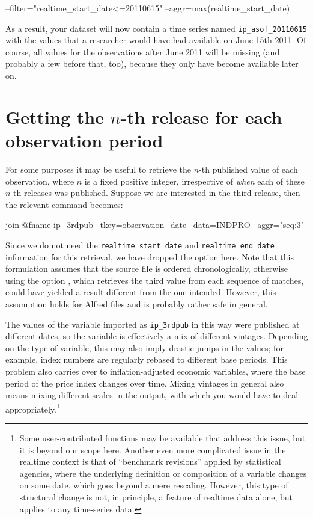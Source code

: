 \begin{code}
  --filter="realtime_start_date<=20110615" --aggr=max(realtime_start_date)
\end{code}
As a result, your dataset will now contain a time series named
\verb|ip_asof_20110615| with the values that a researcher would have
had available on June 15th 2011. Of course, all values for the
observations after June 2011 will be missing (and probably a few
before that, too), because they only have become available later on.

\section{Getting the $n$-th release for each observation period}

For some purposes it may be useful to retrieve the $n$-th published
value of each observation, where $n$ is a fixed positive integer,
irrespective of \emph{when} each of these $n$-th releases was
published. Suppose we are interested in the third release, then the
relevant  command becomes:
\begin{code}
  join @fname ip_3rdpub --tkey=observation_date --data=INDPRO --aggr="seq:3"
\end{code}
Since we do not need the \verb|realtime_start_date| and
\verb|realtime_end_date| information for this retrieval, we have
dropped the  option here. Note that this formulation
assumes that the source file is ordered chronologically, otherwise
using the option , which retrieves the third
value from each sequence of matches, could have yielded a result
different from the one intended. However, this assumption holds for
Alfred files and is probably rather safe in general.

The values of the variable imported as \texttt{ip\_3rdpub} in this way
were published at different dates, so the variable is effectively a
mix of different vintages. Depending on the type of variable, this may
also imply drastic jumps in the values; for example, index numbers are
regularly rebased to different base periods. This problem also carries
over to inflation-adjusted economic variables, where the base period
of the price index changes over time. Mixing vintages in general also
means mixing different scales in the output, with which you would have
to deal appropriately.\footnote{Some user-contributed functions may be
  available that address this issue, but it is beyond our scope
  here. Another even more complicated issue in the realtime context is
  that of ``benchmark revisions'' applied by statistical agencies,
  where the underlying definition or composition of a variable changes
  on some date, which goes beyond a mere rescaling. However, this type
  of structural change is not, in principle, a feature of realtime
  data alone, but applies to any time-series data.}


